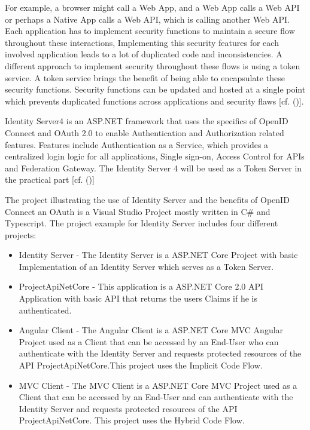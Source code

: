 For example, a browser might call a Web App, and a Web App calls a Web API or perhaps a Native App calls a Web API, which is calling another Web API. Each application has to implement security functions to maintain a secure flow throughout these interactions, Implementing this security features for each involved application leads to a lot of duplicated code and inconsistencies. A different approach to implement security throughout these flows is using a token service. A token service brings the benefit of being able to encapsulate these security functions. Security functions can be updated and hosted at a single point which prevents duplicated functions across applications and security flaws [cf. (\cite{Sakimura:2014:OpenIDConnect})].

Identity Server4 is an ASP.NET framework that uses the specifics of OpenID Connect and OAuth 2.0 to enable Authentication and Authorization related features. Features include Authentication as a Service, which provides a centralized login logic for all applications, Single sign-on, Access Control for APIs and Federation Gateway. The Identity Server 4 will be used as a Token Server in the practical part [cf. (\cite{Brock:2018:ID4})]

The project illustrating the use of Identity Server and the benefits of OpenID Connect an OAuth is a Visual Studio Project mostly written in C\# and Typescript. The project example for Identity Server includes four different projects:

\begin{itemize}
	\item Identity Server - The Identity Server is a ASP.NET Core Project with basic Implementation of an Identity Server which serves as a Token Server. 
	\item ProjectApiNetCore - This application is a ASP.NET Core 2.0 API Application with basic API that returns the users Claims if he is authenticated.
	\item Angular Client - The Angular Client is a ASP.NET Core MVC Angular Project used as a Client that can be accessed by an End-User who can authenticate with the Identity Server and requests protected resources of the API ProjectApiNetCore.This project uses the Implicit Code Flow. 
	\item MVC Client - The MVC Client is a ASP.NET Core MVC Project used as a Client that can be accessed by an End-User and can authenticate with the Identity Server and requests protected resources of the API ProjectApiNetCore. This project uses the Hybrid Code Flow. 
\end{itemize}



